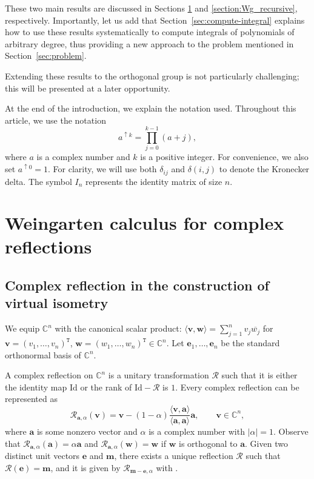 \documentclass[10pt,a4paper]{amsart}
\numberwithin{equation}{section}
\theoremstyle{definition}
\newcommand{\trans}[1]{#1^{\mathtt{T}}}
\newcommand{\Refl}{\mathcal{R}}
\begin{document}
These two main results are discussed in Sections \ref{section:Wg_P} and \ref{section:Wg_recursive}, respectively.
Importantly, let us add that Section~\ref{sec:compute-integral} explains how to use these results systematically to compute integrals of polynomials of arbitrary degree, thus providing a new approach to the problem mentioned in Section~\ref{sec:problem}.

Extending these results to the orthogonal group is not particularly challenging; this will be presented at a later opportunity.


At the end of the introduction, we explain the notation used.
Throughout this article, we use the notation
\[
a^{\uparrow k} = \prod_{j=0}^{k-1} (a+j),
\]
where $a$ is a complex number and $k$ is a positive integer. For convenience, we also set $a^{\uparrow 0}=1$.
For clarity, we will use both $\delta_{ij}$ and $\delta(i,j)$ to denote the Kronecker delta.
The symbol $ I_n $ represents the identity matrix of size $ n $.



\section{Weingarten calculus for complex reflections} \label{section:Wg_P}

\subsection{Complex reflection in the construction of virtual isometry}

We equip $\mathbb{C}^n$ with the canonical scalar product: $\langle \bm{v},\bm{w} \rangle
=\sum_{j=1}^n v_j \overline{w_j}$ for $\bm{v}= \trans{(v_1,\dots,v_n)}$, $\bm{w}=\trans{(w_1,\dots,w_n)} \in \mathbb{C}^n$.
Let $\bm{e}_1,\dots, \bm{e}_n$ be the standard orthonormal basis of $\mathbb{C}^n$.

A complex reflection on $\mathbb{C}^n$ is a unitary transformation $\Refl$ such that it is either the identity map $\mathrm{Id}$ or the rank of $\mathrm{Id}-\Refl$ is $1$.
Every complex reflection can be represented as
\[
\Refl_{\bm{a},\alpha}( \bm{v})= \bm{v} - (1-\alpha) \frac{\langle \bm{v},\bm{a} \rangle}{\langle \bm{a},\bm{a} \rangle} \bm{a}, \qquad \bm{v} \in \mathbb{C}^n,
\]
where $\bm{a}$ is some nonzero vector and $\alpha$ is a complex number with $|\alpha|=1$.
 Observe that $\Refl_{\bm{a},\alpha}(\bm{a})= \alpha \bm{a}$ and
$\Refl_{\bm{a},\alpha}(\bm{w})= \bm{w}$ if $\bm{w}$ is orthogonal to $\bm{a}$.
Given two distinct unit vectors $\bm{e}$ and $\bm{m}$, there exists a unique reflection $\Refl$ such that
$\Refl(\bm{e})=\bm{m}$, and it is given by $\Refl_{\bm{m}-\bm{e},\alpha}$ with .
\end{document}
